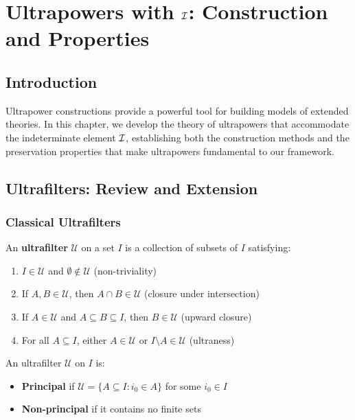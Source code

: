 \chapter{Ultrapowers with $\mathcal{I}$: Construction and Properties}
\label{ch:ultrapowers}

\section{Introduction}

Ultrapower constructions provide a powerful tool for building models of extended theories. In this chapter, we develop the theory of ultrapowers that accommodate the indeterminate element $\mathcal{I}$, establishing both the construction methods and the preservation properties that make ultrapowers fundamental to our framework.

\section{Ultrafilters: Review and Extension}

\subsection{Classical Ultrafilters}

\begin{definition}[Ultrafilter]
An \textbf{ultrafilter} $\mathcal{U}$ on a set $I$ is a collection of subsets of $I$ satisfying:
\begin{enumerate}
    \item $I \in \mathcal{U}$ and $\emptyset \notin \mathcal{U}$ (non-triviality)
    \item If $A, B \in \mathcal{U}$, then $A \cap B \in \mathcal{U}$ (closure under intersection)
    \item If $A \in \mathcal{U}$ and $A \subseteq B \subseteq I$, then $B \in \mathcal{U}$ (upward closure)
    \item For all $A \subseteq I$, either $A \in \mathcal{U}$ or $I \setminus A \in \mathcal{U}$ (ultraness)
\end{enumerate}
\end{definition}

\begin{definition}
An ultrafilter $\mathcal{U}$ on $I$ is:
\begin{itemize}
    \item \textbf{Principal} if $\mathcal{U} = \{A \subseteq I : i_0 \in A\}$ for some $i_0 \in I$
    \item \textbf{Non-principal} if it contains no finite sets
\end{itemize}
\end{definition}

